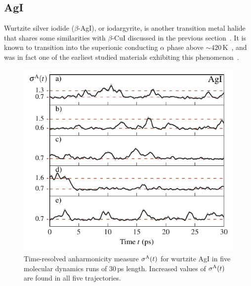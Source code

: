 \subsection{AgI}
Wurtzite silver iodide ($\beta$-AgI), or iodargyrite, is another transition metal halide that shares some similarities with $\beta$-CuI discussed in the previous section~\cite{Boyce.1981}. It is known to transition into the superionic conducting $\alpha$ phase above $\sim 420$\,K~\cite{Hoshino.1957,Boyce.1981,Brenner.2020}, and was in fact one of the earliest studied materials exhibiting this phenomenon~\cite{Strock.1934,Strock.1935,Strock.1936}.
%
\begin{figure}
	\includegraphics[width=\textwidth]{./data/plots/defects/186.02.AgI/sigma_vs_time.pdf}
	\caption{Time-resolved anharmonicity measure $\sigma^\mathrm{A} (t)$ for wurtzite AgI in five molecular dynamics runs of 30\,ps length. Increased values of $\sigma^\mathrm{A} (t)$ are found in all five trajectories.}
	\label{fig:defects.AgI}
\end{figure}
%
